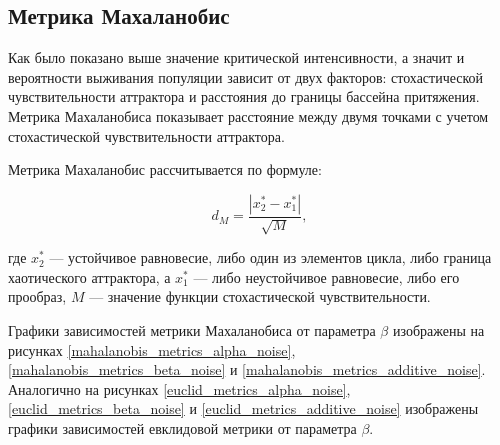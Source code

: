 \subsection{Метрика Махаланобис}

    Как было показано выше значение критической интенсивности, а значит и вероятности выживания популяции зависит от двух факторов: стохастической чувствительности аттрактора и расстояния до границы бассейна притяжения. Метрика Махаланобиса показывает расстояние между двумя точками с учетом стохастической чувствительности аттрактора.

    Метрика Махаланобис рассчитывается по формуле:

    \[
        d_M = \frac{|x_2^* - x_1^*|}{\sqrt{M}},
    \]
        
    где \(x_2^*\) --- устойчивое равновесие, либо один из элементов цикла, либо граница хаотического аттрактора, а \(x_1^*\) --- либо неустойчивое равновесие, либо его прообраз, \(M\) --- значение функции стохастической чувствительности.

    Графики зависимостей метрики Махаланобиса от параметра \(\beta\) изображены на рисунках \ref{mahalanobis_metrics_alpha_noise}, \ref{mahalanobis_metrics_beta_noise} и \ref{mahalanobis_metrics_additive_noise}. Аналогично на рисунках \ref{euclid_metrics_alpha_noise}, \ref{euclid_metrics_beta_noise} и \ref{euclid_metrics_additive_noise} изображены графики зависимостей евклидовой метрики от параметра \(\beta\).

